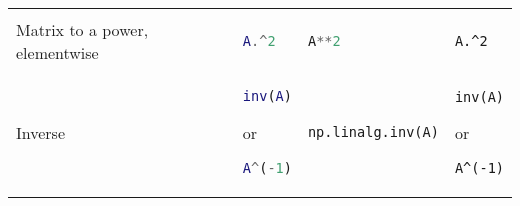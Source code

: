 \begin{tabular}[]{@{}llll@{}}
\begin{minipage}[t]{0.20\columnwidth}
\end{minipage}\tabularnewline
\begin{minipage}[t]{0.23\columnwidth}\raggedright
Matrix to a power, elementwise
\end{minipage} & \begin{minipage}[t]{0.22\columnwidth}\raggedright
\begin{lstlisting}[language=Matlab]
A.^2
\end{lstlisting}

\end{minipage} & \begin{minipage}[t]{0.23\columnwidth}\raggedright
\begin{lstlisting}[language=Python]
A**2
\end{lstlisting}

\end{minipage} & \begin{minipage}[t]{0.20\columnwidth}\raggedright
\begin{lstlisting}
A.^2
\end{lstlisting}

\end{minipage}\tabularnewline
\begin{minipage}[t]{0.23\columnwidth}\raggedright
Inverse
\end{minipage} & \begin{minipage}[t]{0.22\columnwidth}\raggedright
\begin{lstlisting}[language=Matlab]
inv(A)
\end{lstlisting}

or

\begin{lstlisting}[language=Matlab]
A^(-1)
\end{lstlisting}

\end{minipage} & \begin{minipage}[t]{0.23\columnwidth}\raggedright
\begin{lstlisting}[language=Python]
np.linalg.inv(A)
\end{lstlisting}

\end{minipage} & \begin{minipage}[t]{0.20\columnwidth}\raggedright
\begin{lstlisting}
inv(A)
\end{lstlisting}

or

\begin{lstlisting}
A^(-1)
\end{lstlisting}


\end{minipage}
\end{tabular}
